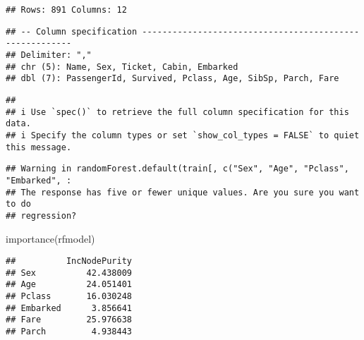 \documentclass[
]{article}
\newenvironment{Shaded}{\begin{snugshade}}{\end{snugshade}}
\newcommand{\AttributeTok}[1]{\textcolor[rgb]{0.77,0.63,0.00}{#1}}
\newcommand{\CommentTok}[1]{\textcolor[rgb]{0.56,0.35,0.01}{\textit{#1}}}
\newcommand{\DecValTok}[1]{\textcolor[rgb]{0.00,0.00,0.81}{#1}}
\newcommand{\FunctionTok}[1]{\textcolor[rgb]{0.00,0.00,0.00}{#1}}
\newcommand{\NormalTok}[1]{#1}
\newcommand{\OtherTok}[1]{\textcolor[rgb]{0.56,0.35,0.01}{#1}}
\newcommand{\SpecialCharTok}[1]{\textcolor[rgb]{0.00,0.00,0.00}{#1}}
\newcommand{\StringTok}[1]{\textcolor[rgb]{0.31,0.60,0.02}{#1}}
\begin{document}
\begin{verbatim}
## Rows: 891 Columns: 12
\end{verbatim}

\begin{verbatim}
## -- Column specification --------------------------------------------------------
## Delimiter: ","
## chr (5): Name, Sex, Ticket, Cabin, Embarked
## dbl (7): PassengerId, Survived, Pclass, Age, SibSp, Parch, Fare
\end{verbatim}

\begin{verbatim}
## 
## i Use `spec()` to retrieve the full column specification for this data.
## i Specify the column types or set `show_col_types = FALSE` to quiet this message.
\end{verbatim}

\begin{Shaded}
\end{Shaded}

\begin{verbatim}
## Warning in randomForest.default(train[, c("Sex", "Age", "Pclass", "Embarked", :
## The response has five or fewer unique values. Are you sure you want to do
## regression?
\end{verbatim}

\begin{Shaded}
\begin{Highlighting}[]
\FunctionTok{importance}\NormalTok{(rfmodel)}
\end{Highlighting}
\end{Shaded}

\begin{verbatim}
##          IncNodePurity
## Sex          42.438009
## Age          24.051401
## Pclass       16.030248
## Embarked      3.856641
## Fare         25.976638
## Parch         4.938443
\end{verbatim}
\end{document}
